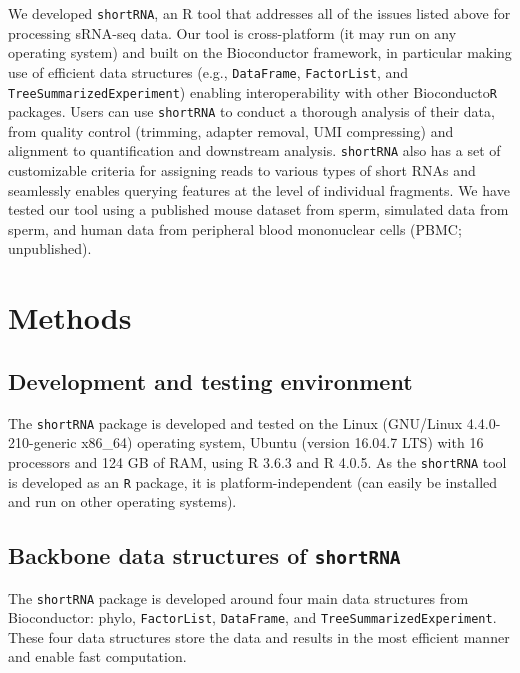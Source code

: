 \documentclass[12pt,twoside]{reedthesis}
\begin{document}
We developed \texttt{shortRNA}, an R tool that addresses all of the issues listed
above for processing sRNA-seq data. Our tool is cross-platform (it may
run on any operating system) and built on the Bioconductor framework, in
particular making use of efficient data structures (e.g., \texttt{DataFrame},
\texttt{FactorList}, and \texttt{TreeSummarizedExperiment}) enabling interoperability with
other Bioconducto\texttt{R} packages. Users can use \texttt{shortRNA} to conduct a
thorough analysis of their data, from quality control (trimming, adapter
removal, UMI compressing) and alignment to quantification and downstream
analysis. \texttt{shortRNA} also has a set of customizable criteria for assigning
reads to various types of short RNAs and seamlessly enables querying
features at the level of individual fragments. We have tested our tool
using a published mouse dataset from sperm, simulated data from sperm,
and human data from peripheral blood mononuclear cells (PBMC;
unpublished).

\hypertarget{methods}{%
\section{Methods}\label{methods}}

\hypertarget{development-and-testing-environment}{%
\subsection{Development and testing environment}\label{development-and-testing-environment}}

The \texttt{shortRNA} package is developed and tested on the Linux (GNU/Linux
4.4.0-210-generic x86\_64) operating system, Ubuntu (version 16.04.7 LTS)
with 16 processors and 124 GB of RAM, using R 3.6.3 and R 4.0.5. As the
\texttt{shortRNA} tool is developed as an \texttt{R} package, it is platform-independent
(can easily be installed and run on other operating systems).

\hypertarget{backbone-data-structures-of-shortrna}{%
\subsection{\texorpdfstring{Backbone data structures of \texttt{shortRNA}}{Backbone data structures of shortRNA}}\label{backbone-data-structures-of-shortrna}}

The \texttt{shortRNA} package is developed around four main data structures from
Bioconductor: phylo, \texttt{FactorList}, \texttt{DataFrame}, and
\texttt{TreeSummarizedExperiment}. These four data structures store the data and
results in the most efficient manner and enable fast computation.
\end{document}
